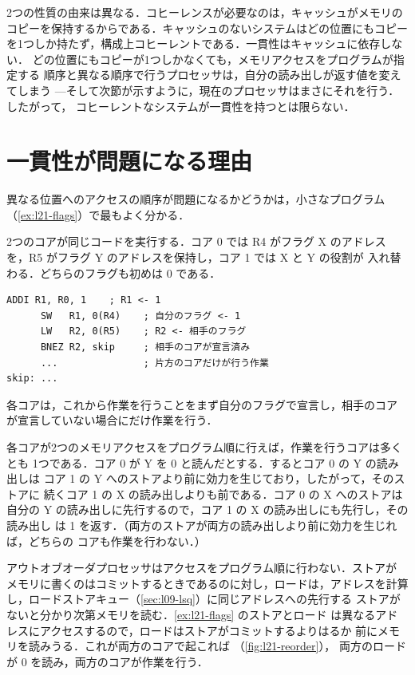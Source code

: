 \documentclass[../main.tex]{subfiles}
\begin{document}
2つの性質の由来は異なる．コヒーレンスが必要なのは，キャッシュがメモリの
コピーを保持するからである．キャッシュのないシステムはどの位置にもコピー
を1つしか持たず，構成上コヒーレントである．一貫性はキャッシュに依存しない．
どの位置にもコピーが1つしかなくても，メモリアクセスをプログラムが指定する
順序と異なる順序で行うプロセッサは，自分の読み出しが返す値を変えてしまう
---そして次節が示すように，現在のプロセッサはまさにそれを行う．したがって，
コヒーレントなシステムが一貫性を持つとは限らない．

\section{一貫性が問題になる理由}
\label{sec:l21-matters}

異なる位置へのアクセスの順序が問題になるかどうかは，小さなプログラム
（\cref{ex:l21-flags}）で最もよく分かる．

\begin{example}[2つのフラグ]
  \label{ex:l21-flags}
  2つのコアが同じコードを実行する．コア 0 では R4 がフラグ X のアドレス
  を，R5 がフラグ Y のアドレスを保持し，コア 1 では X と Y の役割が
  入れ替わる．どちらのフラグも初めは 0 である．
  \begin{lstlisting}[language={[x86masm]Assembler}, numbers=none]
      ADDI R1, R0, 1    ; R1 <- 1
      SW   R1, 0(R4)    ; 自分のフラグ <- 1
      LW   R2, 0(R5)    ; R2 <- 相手のフラグ
      BNEZ R2, skip     ; 相手のコアが宣言済み
      ...               ; 片方のコアだけが行う作業
skip: ...
\end{lstlisting}
  各コアは，これから作業を行うことをまず自分のフラグで宣言し，相手のコア
  が宣言していない場合にだけ作業を行う．
\end{example}

各コアが2つのメモリアクセスをプログラム順に行えば，作業を行うコアは多くとも
1つである．コア 0 が Y を 0 と読んだとする．するとコア 0 の Y の読み出しは
コア 1 の Y へのストアより前に効力を生じており，したがって，そのストアに
続くコア 1 の X の読み出しよりも前である．コア 0 の X へのストアは自分の
Y の読み出しに先行するので，コア 1 の X の読み出しにも先行し，その読み出し
は 1 を返す．（両方のストアが両方の読み出しより前に効力を生じれば，どちらの
コアも作業を行わない．）

アウトオブオーダプロセッサはアクセスをプログラム順に行わない．ストアが
メモリに書くのはコミットするときであるのに対し，ロードは，アドレスを計算
し，ロードストアキュー（\cref{sec:l09-lsq}）に同じアドレスへの先行する
ストアがないと分かり次第メモリを読む．\cref{ex:l21-flags} のストアとロード
は異なるアドレスにアクセスするので，ロードはストアがコミットするよりはるか
前にメモリを読みうる．これが両方のコアで起これば
（\cref{fig:l21-reorder}），
両方のロードが 0 を読み，両方のコアが作業を行う．
\end{document}
